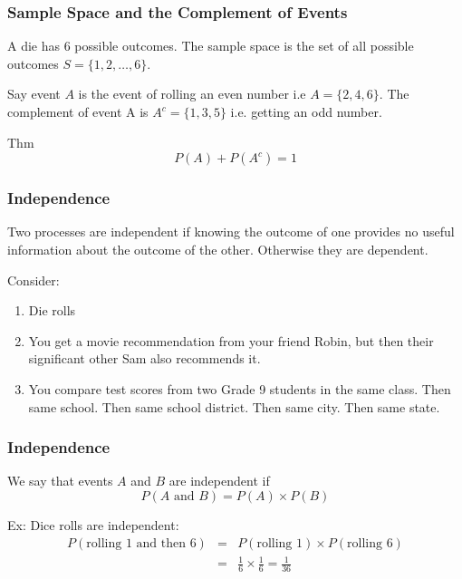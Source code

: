 \documentclass[slides]{beamer}
\newcommand{\blue}[1]{\textcolor{blue2}{#1}}
\begin{document}
\begin{frame}
\frametitle{Sample Space and the Complement of Events}
A die has 6 possible outcomes.  The \blue{sample space} is the set of all possible outcomes $S = \{1, 2, \ldots, 6\}$.  

\pause \vspace{0.75cm}
Say event $A$ is the event of rolling an even number i.e $A=\{2, 4, 6\}$.  The \blue{complement of event} A is $A^c=\{1, 3, 5\}$ i.e. getting an odd number.  

\pause \vspace{0.75cm}
Thm
\[
P(A) + P(A^c) = 1
\]

\end{frame}


\begin{frame}
\frametitle{Independence}
Two processes are \blue{independent} if knowing the outcome of one provides no useful information about the outcome of the other.  Otherwise they are dependent.

\vspace{0.5cm}

\pause Consider:
\begin{enumerate}
\pause \item Die rolls
\pause \item You get a movie recommendation from your friend Robin, but then their significant other Sam also recommends it.  
\pause \item You compare test scores from two Grade 9 students in the same class.  Then same school.  Then same school district.  Then same city.  Then same state.
\end{enumerate}

\end{frame}


\begin{frame}
\frametitle{Independence}
We say that events $A$ and $B$ are \blue{independent} if
\[
P(A \mbox{ and } B) = P(A) \times P(B)
\]

\vspace{0.25cm}

\pause Ex: Dice rolls are independent:
\begin{eqnarray*}
P(\mbox{rolling 1 and then 6}) &=& P(\mbox{rolling 1}) \times P(\mbox{rolling 6})\\
&=& \frac{1}{6}\times\frac{1}{6} = \frac{1}{36}
\end{eqnarray*}

\end{frame}
\end{document}
